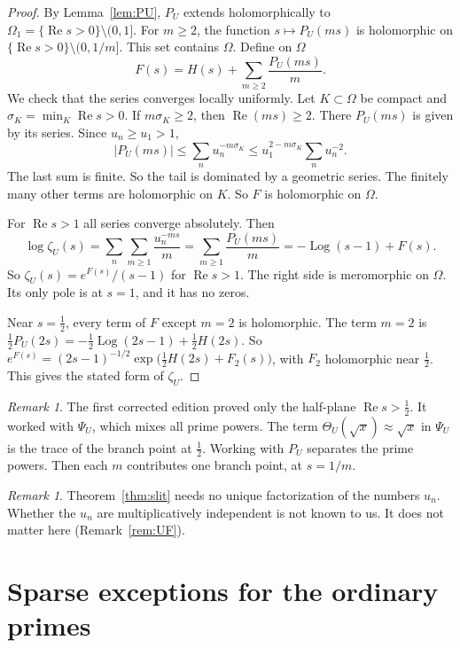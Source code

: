 \documentclass[12pt,letterpaper]{article}
\theoremstyle{definition}
\theoremstyle{remark}
\newtheorem{remark}[theorem]{Remark}
\newcommand{\Log}{\operatorname{Log}}
\newcommand{\Ree}{\operatorname{Re}}
\begin{document}
\begin{proof}
By Lemma~\ref{lem:PU}, $P_U$ extends holomorphically to
$\Omega_1=\{\Ree s>0\}\setminus(0,1]$. For $m\ge2$, the function
$s\mapsto P_U(ms)$ is holomorphic on $\{\Ree s>0\}\setminus(0,1/m]$. This
set contains $\Omega$. Define on $\Omega$
\[
F(s)=H(s)+\sum_{m\ge2}\frac{P_U(ms)}{m}.
\]
We check that the series converges locally uniformly. Let $K\subset\Omega$
be compact and $\sigma_K=\min_K\Ree s>0$. If $m\sigma_K\ge2$, then
$\Ree(ms)\ge2$. There $P_U(ms)$ is given by its series. Since $u_n\ge u_1>1$,
\[
|P_U(ms)|\le\sum_n u_n^{-m\sigma_K}
\le u_1^{2-m\sigma_K}\sum_n u_n^{-2}.
\]
The last sum is finite. So the tail is dominated by a geometric series.
The finitely many other terms are holomorphic on $K$. So $F$ is
holomorphic on $\Omega$.

For $\Ree s>1$ all series converge absolutely. Then
\[
\log\zeta_U(s)=\sum_n\sum_{m\ge1}\frac{u_n^{-ms}}{m}
=\sum_{m\ge1}\frac{P_U(ms)}{m}=-\Log(s-1)+F(s).
\]
So $\zeta_U(s)=e^{F(s)}/(s-1)$ for $\Ree s>1$. The right side is
meromorphic on $\Omega$. Its only pole is at $s=1$, and it has no zeros.

Near $s=\frac12$, every term of $F$ except $m=2$ is holomorphic. The term
$m=2$ is $\tfrac12P_U(2s)=-\tfrac12\Log(2s-1)+\tfrac12H(2s)$. So
$e^{F(s)}=(2s-1)^{-1/2}\exp\bigl(\tfrac12H(2s)+F_2(s)\bigr)$, with $F_2$
holomorphic near $\frac12$. This gives the stated form of $\zeta_U$.
\end{proof}

\begin{remark}
The first corrected edition proved only the half-plane $\Ree s>\frac12$.
It worked with $\Psi_U$, which mixes all prime powers. The term
$\Theta_U(\sqrt{x})\approx\sqrt{x}$ in $\Psi_U$ is the trace of the branch
point at $\frac12$. Working with $P_U$ separates the prime powers. Then
each $m$ contributes one branch point, at $s=1/m$.
\end{remark}

\begin{remark}
Theorem~\ref{thm:slit} needs no unique factorization of the numbers
$u_n$. Whether the $u_n$ are multiplicatively independent is not known to
us. It does not matter here (Remark~\ref{rem:UF}).
\end{remark}

\section{Sparse exceptions for the ordinary primes}\label{sec:sparse}
\end{document}
